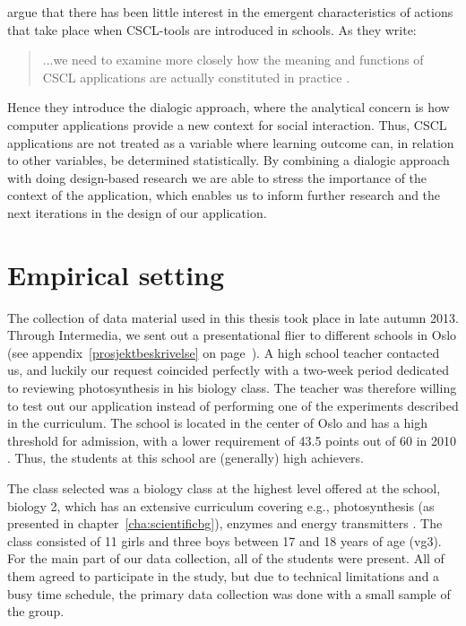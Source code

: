 \citeauthor*{arnseth2006approaching} argue that there has been little interest in the emergent characteristics of actions that take place when CSCL-tools are introduced in schools. As they write: \begin{quote}...we need to examine more closely how the meaning and functions of CSCL applications are actually constituted in practice \citep[p. 181]{arnseth2006approaching}.\end{quote} Hence they introduce the dialogic approach, where the analytical concern is how computer applications provide a new context for social interaction. Thus, CSCL applications are not treated as a variable where learning outcome can, in relation to other variables, be determined statistically. By combining a dialogic approach with doing design-based research we are able to stress the importance of the context of the application, which enables us to inform further research and the next iterations in the design of our application.  

\section{Empirical setting}
The collection of data material used in this thesis took place in late autumn 2013. Through Intermedia, we sent out a presentational flier to different schools in Oslo (see appendix~\ref{prosjektbeskrivelse} on page~\pageref{prosjektbeskrivelse}). A high school teacher contacted us, and luckily our request coincided perfectly with a two-week period dedicated to reviewing photosynthesis in his biology class. The teacher was therefore willing to test out our application instead of performing one of the experiments described in the curriculum. The school is located in the center of Oslo and has a high threshold for admission, with a lower requirement of 43.5 points out of 60 in 2010 \citep{utdanningsetaten}. Thus, the students at this school are (generally) high achievers.  

The class selected was a biology class at the highest level offered at the school, biology 2, which has an extensive curriculum covering e.g., photosynthesis (as presented in chapter~\ref{cha:scientificbg}), enzymes and energy transmitters \citep{bios}. The class consisted of 11 girls and three boys between 17 and 18 years of age (vg3). For the main part of our data collection, all of the students were present. All of them agreed to participate in the study, but due to technical limitations and a busy time schedule, the primary data collection was  done with a small sample of the group. 


